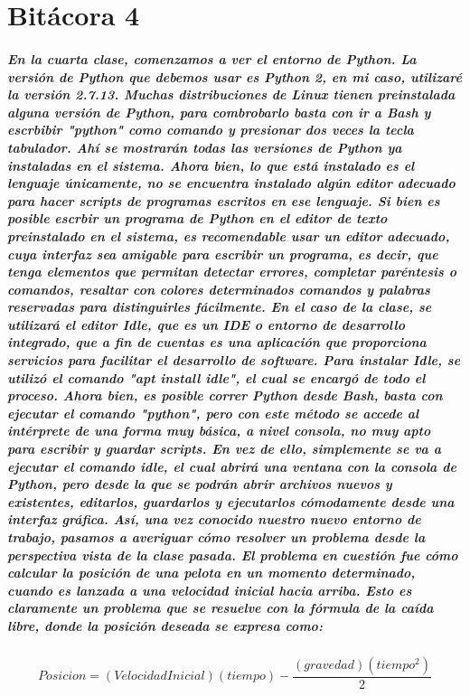 \documentclass{book}
\begin{document}
	\chapter{Bitácora 4}
	\paragraph{En la cuarta clase, comenzamos a ver el entorno de Python. La versión de Python que debemos usar es Python 2, en mi caso, utilizaré la versión 2.7.13. Muchas distribuciones de Linux tienen preinstalada alguna versión de Python, para combrobarlo basta con ir a Bash y escrbibir "python" como comando y presionar dos veces la tecla tabulador. Ahí se mostrarán todas las versiones de Python ya instaladas en el sistema. Ahora bien, lo que está instalado es el lenguaje únicamente, no se encuentra instalado algún editor adecuado para hacer scripts de programas escritos en ese lenguaje. Si bien es posible escrbir un programa de Python en el editor de texto preinstalado en el sistema, es recomendable usar un editor adecuado, cuya interfaz sea amigable para escribir un programa, es decir, que tenga elementos que permitan detectar errores, completar paréntesis o comandos, resaltar con colores determinados comandos y palabras reservadas para distinguirles fácilmente. En el caso de la clase, se utilizará el editor Idle, que es un IDE o entorno de desarrollo integrado, que a fin de cuentas es una aplicación que proporciona servicios para facilitar el desarrollo de software. Para instalar Idle, se utilizó el comando "apt install idle", el cual se encargó de todo el proceso. Ahora bien, es posible correr Python desde Bash, basta con ejecutar el comando "python", pero con este método se accede al intérprete de una forma muy básica, a nivel consola, no muy apto para escribir y guardar scripts. En vez de ello, simplemente se va a ejecutar el comando idle, el cual abrirá una ventana con la consola de Python, pero desde la que se podrán abrir archivos nuevos y existentes, editarlos, guardarlos y ejecutarlos cómodamente desde una interfaz gráfica. Así, una vez conocido nuestro nuevo entorno de trabajo, pasamos a averiguar cómo resolver un problema desde la perspectiva vista de la clase pasada. El problema en cuestión fue cómo calcular la posición de una pelota en un momento determinado, cuando es lanzada a una velocidad inicial hacia arriba. Esto es claramente un problema que se resuelve con la fórmula de la caída libre, donde la posición deseada se expresa como:}
	\begin{equation}
	Posicion = (VelocidadInicial)(tiempo) - \frac{(gravedad)(tiempo^2)}{2}
	\end{equation}
\end{document}
